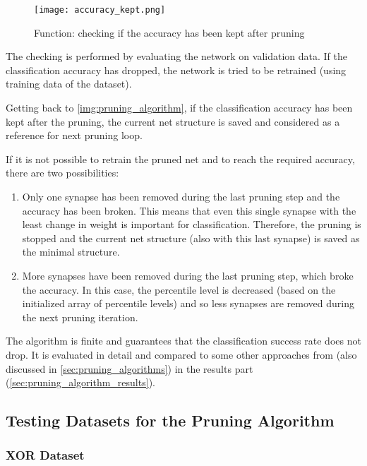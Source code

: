 \begin{figure}[H]
  \centering
  \texttt{[image: accuracy\_kept.png]}
  \caption{Function: checking if the accuracy has been kept after pruning}
  \label{img:accuracy_kept}
\end{figure}

The checking is performed by evaluating the network on validation data. If the classification accuracy has dropped, the network is tried to be retrained (using training data of the dataset).

Getting back to \cref{img:pruning_algorithm}, if the classification accuracy has been kept after the pruning, the current net structure is saved and considered as a reference for next pruning loop.

If it is not possible to retrain the pruned net and to reach the required accuracy, there are two possibilities:

\begin{enumerate}
\item Only one synapse has been removed during the last pruning step and the accuracy has been broken. This means that even this single synapse with the least change in weight is important for classification. Therefore, the pruning is stopped and the current net structure (also with this last synapse) is saved as the minimal structure.
\item More synapses have been removed during the last pruning step, which broke the accuracy. In this case, the percentile level is decreased (based on the initialized array of percentile levels) and so less synapses are removed during the next pruning iteration.
\end{enumerate}

The algorithm is finite and guarantees that the classification success rate does not drop. It is evaluated in detail and compared to some other approaches from \citep{article:10:pa} (also discussed in \cref{sec:pruning_algorithms}) in the results part (\cref{sec:pruning_algorithm_results}).

\subsection{Testing Datasets for the Pruning Algorithm}

\subsubsection*{XOR Dataset}

